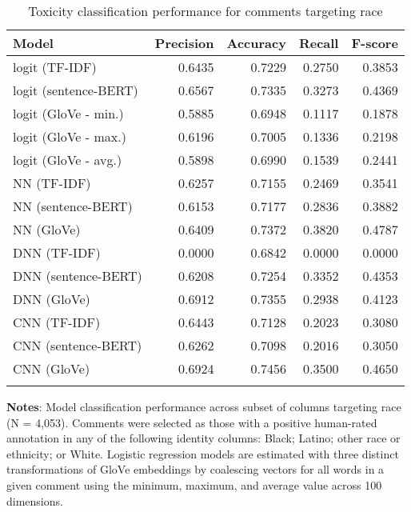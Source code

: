 \begin{table}[h]
	\caption{Toxicity classification performance for comments targeting race \label{table:performance-race}}
    \centering
	\begin{tabular}{lrrrr}
		\toprule
			Model &  Precision &  Accuracy &  Recall &  F-score \\
		\midrule
			\addlinespace{}
			\parbox{7.5cm}{logit (TF-IDF)} &    0.6435 &    0.7229 &  0.2750 &   0.3853 \\
			\addlinespace{}
			logit (sentence-BERT) &    0.6567 &    0.7335 &  0.3273 &   0.4369 \\
			\addlinespace{}
			logit (GloVe - min.) &     0.5885 &    0.6948 &  0.1117 &   0.1878 \\
			\addlinespace{}
			logit (GloVe - max.) &     0.6196 &    0.7005 &  0.1336 &   0.2198 \\
			\addlinespace{}
			logit (GloVe - avg.) &     0.5898 &    0.6990 &  0.1539 &   0.2441 \\
			\addlinespace{}
			NN (TF-IDF) &     0.6257 &    0.7155 &  0.2469 &   0.3541 \\
			\addlinespace{}
			NN (sentence-BERT) &     0.6153 &    0.7177 &  0.2836 &   0.3882 \\
			\addlinespace{}
			NN (GloVe) &     0.6409 &    0.7372 &  0.3820 &   0.4787 \\
			\addlinespace{}
			DNN (TF-IDF) &     0.0000 &    0.6842 &  0.0000 &   0.0000 \\
			\addlinespace{}
			DNN (sentence-BERT) &     0.6208 &    0.7254 &  0.3352 &   0.4353 \\
			\addlinespace{}
			DNN (GloVe) &     0.6912 &    0.7355 &  0.2938 &   0.4123 \\
			\addlinespace{}
			CNN (TF-IDF) &      0.6443 &    0.7128 &  0.2023 &   0.3080 \\
			\addlinespace{}
			CNN (sentence-BERT)  &     0.6262 &    0.7098 &  0.2016 &   0.3050 \\
			\addlinespace{}
			CNN (GloVe)  &     0.6924 &    0.7456 &  0.3500 &   0.4650 \\
	\bottomrule
	\addlinespace[1em]
	\end{tabular}
	\parbox{14.5cm}{\textbf{Notes}: Model classification performance across subset of columns targeting race (N = 4,053). Comments were selected as those with a positive human-rated annotation in any of the following identity columns: Black; Latino; other race or ethnicity; or White. Logistic regression models are estimated with three distinct transformations of GloVe embeddings by coalescing vectors for all words in a given comment using the minimum, maximum, and average value across 100 dimensions.}
\end{table}


